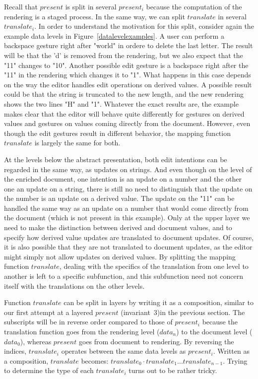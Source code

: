 \documentclass[twoside,epsf]{report}
\begin{document}
Recall that $present$ is split in several $present_i$ because the computation of the rendering is a staged process. In the same way, we can split $translate$ in several $translate_i$. In order to understand the motivation for this split, consider again the example data levels in Figure~\ref{datalevelexamples}. A user can perform a backspace gesture right after "world" in ordere to delete the last letter. The result will be that the 'd' is removed from the rendering, but we also expect that the "11" changes to "10". Another possible edit gesture is a backspace right after the "11" in the rendering which changes it to "1". What happens in this case depends on the way the editor handles edit operations on derived values. A possible result could be that the string is truncated to the new length, and the new rendering shows the two lines "{H}" and "{1}". Whatever the exact results are, the example makes clear that the editor will behave quite differently for gestures on derived values and gestures on values coming directly from the document. However, even though the edit gestures result in different behavior, the mapping function $translate$ is largely the same for both.

At the levels below the abstract presentation, both edit intentions can be regarded in the same way, as updates on strings. And even though on the level of the enriched document, one intention is an update on a number and the other one an update on a string, there is still no need to distinguish that the update on the number is an update on a derived value. The update on the "11" can be handled the same way as an update on a number that would come directly from the document (which is not present in this example). Only at the upper layer we need to make the distinction between derived and document values, and to specify how derived value updates are translated to document updates. Of course, it is also possible that they are not translated to document updates, as the editor might simply not allow updates on derived values. By splitting the mapping function $translate$, dealing with the specifics of the translation from one level to another is left to a specific subfunction, and this subfunction need not concern itself with the translations on the other levels.

Function $translate$ can be split in layers by writing it as a composition, similar to our first attempt at a layered $present$ (invariant~3)in the previous section. The subscripts will be in reverse order compared to those of $present_i$ because the translation function goes from the rendering level ($data_n$) to the document level ($data_0$), whereas $present$ goes from document to rendering. By reversing the indices, $translate_i$ operates between the same data levels as $present_i$. Written as a composition, $translate$ becomes: $translate_0 \cdot translate_1 \dots translate_{n-1}$. Trying to determine the type of each $translate_i$ turns out to be rather tricky.
\end{document}
